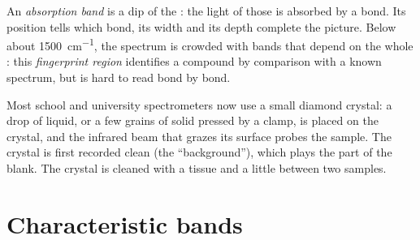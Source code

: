 \begin{definition}\label{def:g11:infrared:band}
An \emph{absorption band} is a dip of the
: the light of those  is absorbed by a bond. Its
position tells which bond, its width and its depth complete the
picture. Below about \qty{1500}{cm^{-1}}, the spectrum is crowded with
bands that depend on the whole : this \emph{fingerprint
region} identifies a compound by comparison
with a known spectrum, but is hard to read bond by bond.
\end{definition}

\begin{inthelab}
Most school and university spectrometers now use a small diamond crystal:
a drop of liquid, or a few grains of solid pressed by a clamp, is placed
on the crystal, and the infrared beam that grazes its surface probes the
sample. The crystal is first recorded clean (the ``background''), which
plays the part of the blank. The crystal is cleaned with a tissue and a
little  between two samples.
\end{inthelab}

\section{Characteristic bands}

